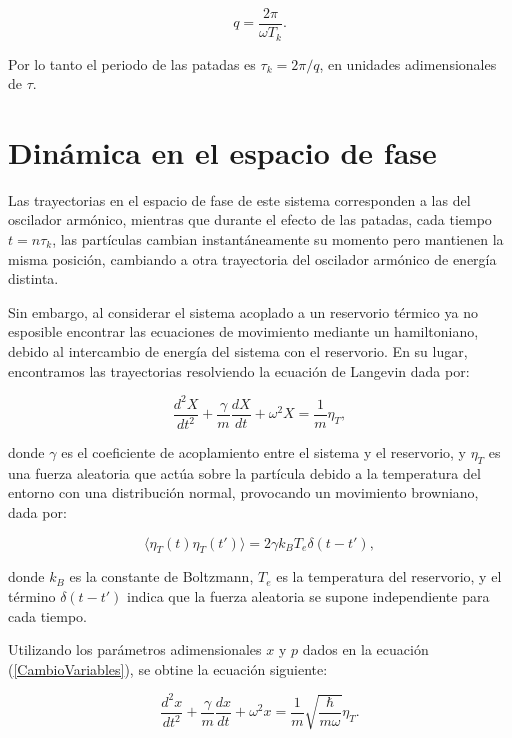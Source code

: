 \documentclass[letterpaper,12pt,oneside]{book}
\begin{document}
	\begin{equation}
		q = \frac{2\pi}{\omega T_k}.
	\end{equation}
	
	Por lo tanto el periodo de las patadas es $\tau_k = 2\pi/q$, en unidades adimensionales de $\tau$.
	
	\section{Din\'amica en el espacio de fase}
	
	Las trayectorias en el espacio de fase de este sistema corresponden a las del oscilador arm\'onico, mientras que durante el efecto de las patadas, cada tiempo $t = n\tau_k$, las part\'iculas cambian instant\'aneamente su momento pero mantienen la misma posici\'on, cambiando a otra trayectoria del oscilador arm\'onico de energ\'ia distinta.
	
	Sin embargo, al considerar el sistema acoplado a un reservorio t\'ermico ya no esposible encontrar las ecuaciones de movimiento mediante un hamiltoniano, debido al intercambio de energ\'ia del sistema con el reservorio. En su lugar, encontramos las trayectorias resolviendo la ecuaci\'on de Langevin dada por: 
	
	\begin{equation}\label{LangevinOriginal}
		\frac{d^2X}{dt^2} + \frac{\gamma}{m}\frac{dX}{dt} + \omega^2 X = \frac{1}{m}\eta_T,
	\end{equation}
	
	\noindent donde $\gamma$ es el coeficiente de acoplamiento entre el sistema y el reservorio, y $\eta_T$ es una fuerza aleatoria que act\'ua sobre la part\'icula debido a la temperatura del entorno  con una distribuci\'on normal, provocando un movimiento browniano, dada por:
	
	\begin{equation}\label{EtaTemperatura}
		\langle \eta_T(t)\eta_T(t') \rangle = 2\gamma k_B T_e\delta(t-t'),
	\end{equation}
	
	\noindent donde $k_B$ es la constante de Boltzmann, $T_e$ es la temperatura del reservorio, y el t\'ermino $\delta(t-t')$ indica que la fuerza aleatoria se supone independiente para cada tiempo.
	
	Utilizando los par\'ametros adimensionales $x$ y $p$ dados en la ecuaci\'on (\ref{CambioVariables}), se obtine la ecuaci\'on siguiente:
	
	\begin{equation}
		\frac{d^2x}{dt^2} +  \frac{\gamma}{m}\frac{dx}{dt} + \omega^2x = \frac{1}{m} \sqrt{\frac{\hbar}{m\omega}} \eta_T.
	\end{equation} 
	
\end{document}
